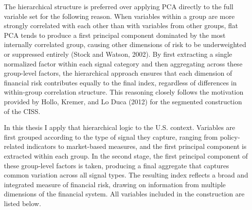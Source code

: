 \documentclass[12pt,a4paper]{report}\usepackage[a4paper, top=2.5cm, bottom=2.5cm, left=2.5cm, right=2.5cm]{geometry}
\begin{document}
The hierarchical structure is preferred over applying PCA directly to the full variable set for the following reason. When variables within a group are more strongly correlated with each other than with variables from other groups, flat PCA tends to produce a first principal component dominated by the most internally correlated group, causing other dimensions of risk to be underweighted or suppressed entirely (Stock and Watson, 2002). By first extracting a single normalized factor within each signal category and then aggregating across these group-level factors, the hierarchical approach ensures that each dimension of financial risk contributes equally to the final index, regardless of differences in within-group correlation structure. This reasoning closely follows the motivation provided by Hollo, Kremer, and Lo Duca (2012) for the segmented construction of the CISS.

In this thesis I apply that hierarchical logic to the U.S. context. Variables are first grouped according to the type of signal they capture, ranging from policy-related indicators to market-based measures, and the first principal component is extracted within each group. In the second stage, the first principal component of these group-level factors is taken, producing a final aggregate that captures common variation across all signal types. The resulting index reflects a broad and integrated measure of financial risk, drawing on information from multiple dimensions of the financial system. All variables included in the construction are listed below.
\end{document}
